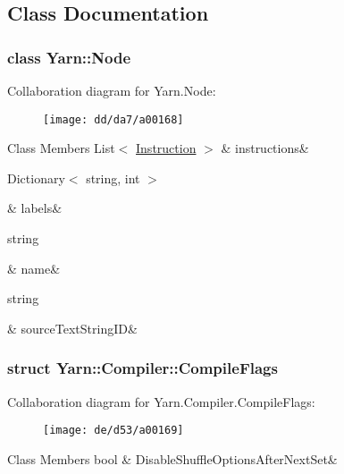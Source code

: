 \subsection{Class Documentation}
\label{de/d38/a00160}
\hypertarget{a00026_de/d38/a00160}{}
\subsubsection{class Yarn\-:\-:Node}


Collaboration diagram for Yarn.\-Node\-:
\nopagebreak
\begin{figure}[H]
\begin{center}
\leavevmode
\texttt{[image: dd/da7/a00168]}
\end{center}
\end{figure}
\begin{DoxyFields}{Class Members}
\hypertarget{a00026_a156723a9252b62d288ddf611939ea7c3}{List$<$ \hyperlink{a00044}{Instruction} $>$}\label{a00026_a156723a9252b62d288ddf611939ea7c3}
&
instructions&
\\
\hline

\hypertarget{a00026_a9afa49f4fbc72e806a0210cb4198f12e}{Dictionary$<$ string, int $>$}\label{a00026_a9afa49f4fbc72e806a0210cb4198f12e}
&
labels&
\\
\hline

\hypertarget{a00026_a107b0de3fcfc65e99913edc01b5ce9db}{string}\label{a00026_a107b0de3fcfc65e99913edc01b5ce9db}
&
name&
\\
\hline

\hypertarget{a00026_a09c6af5b50925d0876283b84281b3ed4}{string}\label{a00026_a09c6af5b50925d0876283b84281b3ed4}
&
source\-Text\-String\-I\-D&
\\
\hline

\end{DoxyFields}
\label{d1/db7/a00157}
\hypertarget{a00029_d1/db7/a00157}{}
\subsubsection{struct Yarn\-:\-:Compiler\-:\-:Compile\-Flags}


Collaboration diagram for Yarn.\-Compiler.\-Compile\-Flags\-:
\nopagebreak
\begin{figure}[H]
\begin{center}
\leavevmode
\texttt{[image: de/d53/a00169]}
\end{center}
\end{figure}
\begin{DoxyFields}{Class Members}
\hypertarget{a00029_a8b49bb7763ff477cba21d7c771ef3ed0}{bool}\label{a00029_a8b49bb7763ff477cba21d7c771ef3ed0}
&
Disable\-Shuffle\-Options\-After\-Next\-Set&
\\
\hline

\end{DoxyFields}
